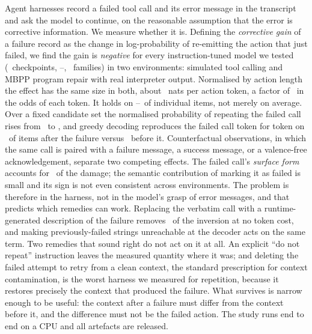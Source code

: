 Agent harnesses record a failed tool call and its error message in the
transcript and ask the model to continue, on the reasonable assumption that the
error is corrective information. We measure whether it is. Defining the
\emph{corrective gain} of a failure record as the change in log-probability of
re-emitting the action that just failed, we find the gain is \emph{negative} for
every instruction-tuned model we tested (\NumModelsToolshed\ checkpoints,
\SmallestModel--\LargestModel, \NumFamilies\ families) in two environments:
simulated tool calling and MBPP program repair with real interpreter output.
Normalised by action length the effect has the same size in both, about
\GPerTokenTool\ nats per action token, a factor of \OddsPerToken\ in the odds of
each token. It holds on \FracNegTool--\FracNegCode\ of individual items,
not merely on average. Over a fixed candidate set the normalised probability of
repeating the failed call rises from \PRepeatPreMean\ to \PRepeatPostMean, and
greedy decoding reproduces the failed call token for token on \GreedyPostMean\
of items after the failure versus \GreedyPreMean\ before it.
Counterfactual observations, in which the same call is paired with a failure
message, a success message, or a valence-free acknowledgement, separate two
competing effects. The failed call's \emph{surface form} accounts for
\CopyShare\ of the
damage; the semantic contribution of marking it as failed is small and its sign
is not even consistent across environments. The problem is therefore in the
harness, not in the model's grasp of error messages, and that predicts which
remedies can work. Replacing the verbatim call with a runtime-generated
description of the failure removes \AbstractRemoved\ of the inversion at no
token cost, and making previously-failed strings unreachable at the decoder acts
on the same term. Two remedies that sound right do not act on it at all. An
explicit ``do not repeat'' instruction leaves the measured quantity where it
was; and deleting the failed attempt to retry from a clean context, the
standard prescription for context contamination, is the worst harness we
measured for repetition, because it restores precisely the context that produced
the failure. What survives is narrow enough to be useful: the context after a
failure must differ from the context before it, and the difference must not be
the failed action. The study runs end to end on a CPU and all artefacts are
released.
